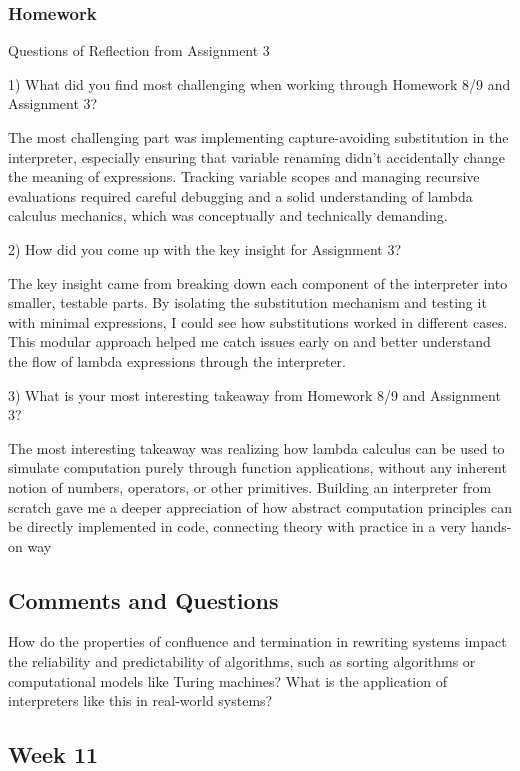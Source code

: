 \documentclass{article}
\theoremstyle{theorem}
\theoremstyle{definition}
\theoremstyle{remark}
\begin{document}
\subsubsection*{Homework}
Questions of Reflection from Assignment 3

1) What did you find most challenging when working through Homework 8/9 and Assignment 3?

The most challenging part was implementing capture-avoiding substitution in the interpreter, especially ensuring that variable renaming didn’t accidentally change the meaning of expressions. Tracking variable scopes and managing recursive evaluations required careful debugging and a solid understanding of lambda calculus mechanics, which was conceptually and technically demanding.

2) How did you come up with the key insight for Assignment 3?

The key insight came from breaking down each component of the interpreter into smaller, testable parts. By isolating the substitution mechanism and testing it with minimal expressions, I could see how substitutions worked in different cases. This modular approach helped me catch issues early on and better understand the flow of lambda expressions through the interpreter.

3) What is your most interesting takeaway from Homework 8/9 and Assignment 3?

The most interesting takeaway was realizing how lambda calculus can be used to simulate computation purely through function applications, without any inherent notion of numbers, operators, or other primitives. Building an interpreter from scratch gave me a deeper appreciation of how abstract computation principles can be directly implemented in code, connecting theory with practice in a very hands-on way

\subsection*{Comments and Questions}

How do the properties of confluence and termination in rewriting systems impact the reliability and predictability of algorithms, such as sorting algorithms or computational models like Turing machines? What is the application of interpreters like this in real-world systems?


\subsection{Week 11}
\end{document}
